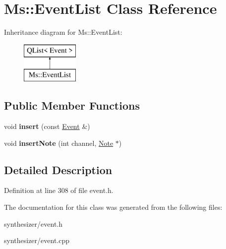 \hypertarget{class_ms_1_1_event_list}{}\section{Ms\+:\+:Event\+List Class Reference}
\label{class_ms_1_1_event_list}
Inheritance diagram for Ms\+:\+:Event\+List\+:\begin{figure}[H]
\begin{center}
\leavevmode
\includegraphics[height=2.000000cm]{class_ms_1_1_event_list}
\end{center}
\end{figure}
\subsection*{Public Member Functions}
\begin{DoxyCompactItemize}
\item 
\mbox{\label{class_ms_1_1_event_list_a4001c12d937d7348c8a35f399627a6b4}} 
void {\bfseries insert} (const \hyperlink{class_ms_1_1_event}{Event} \&)
\item 
\mbox{\label{class_ms_1_1_event_list_aa051542b2275b83fcd7cc684a7336813}} 
void {\bfseries insert\+Note} (int channel, \hyperlink{class_ms_1_1_note}{Note} $\ast$)
\end{DoxyCompactItemize}


\subsection{Detailed Description}


Definition at line 308 of file event.\+h.



The documentation for this class was generated from the following files\+:\begin{DoxyCompactItemize}
\item 
synthesizer/event.\+h\item 
synthesizer/event.\+cpp\end{DoxyCompactItemize}
